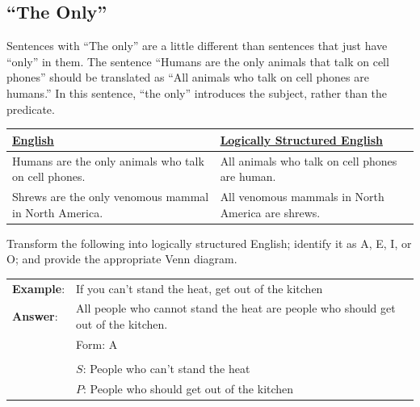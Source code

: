 \subsection{``The Only''}

Sentences with ``The only'' are a little different than sentences that just have ``only'' in them. The sentence ``Humans are the only animals that talk on cell phones'' should be translated as ``All animals who talk on cell phones are humans.'' In this sentence, ``the only'' introduces the subject, rather than the predicate. 

\begin{longtabu}{p{.5\linewidth}p{.5\linewidth}}
\underline{English} &
\underline{Logically Structured English} \\
\endhead 
Humans are the only animals who talk on cell phones. &
All animals who talk on cell phones are human.\\

Shrews are the only venomous mammal in North America. &
All venomous mammals in North America are shrews.\\

\end{longtabu}


\practiceproblems
\noindent\problempart Transform the following into logically structured English; identify it as A, E, I, or O; and provide the appropriate Venn diagram.


\begin{longtabu}{p{.1\linewidth}p{.9\linewidth}}
\textbf{Example}: & If you can't stand the heat, get out of the kitchen \\
\textbf{Answer}:  & All people who cannot stand the heat are people who should get out of the kitchen. \\
& Form: A\\
&
\noindent {}\\
& $S$: People who can't stand the heat\\
& $P$: People who should get out of the kitchen

\end{longtabu}

